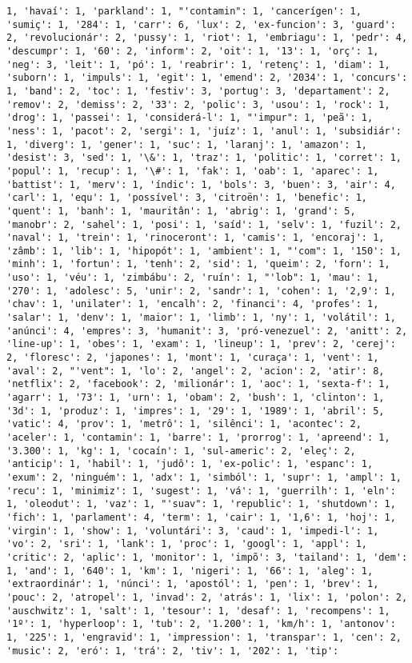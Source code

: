 \documentclass[11pt]{article}
\begin{document}
\begin{Verbatim}[commandchars=\\\{\}]
1, 'havaí': 1, 'parkland': 1, "'contamin": 1, 'cancerígen': 1, 'sumiç': 1, '284': 1, 'carr': 6, 'lux': 2, 'ex-funcion': 3, 'guard': 2, 'revolucionár': 2, 'pussy': 1, 'riot': 1, 'embriagu': 1, 'pedr': 4, 'descumpr': 1, '60': 2, 'inform': 2, 'oit': 1, '13': 1, 'orç': 1, 'neg': 3, 'leit': 1, 'pó': 1, 'reabrir': 1, 'retenç': 1, 'diam': 1, 'suborn': 1, 'impuls': 1, 'egit': 1, 'emend': 2, '2034': 1, 'concurs': 1, 'band': 2, 'toc': 1, 'festiv': 3, 'portug': 3, 'departament': 2, 'remov': 2, 'demiss': 2, '33': 2, 'polic': 3, 'usou': 1, 'rock': 1, 'drog': 1, 'passei': 1, 'considerá-l': 1, "'impur": 1, 'peã': 1, 'ness': 1, 'pacot': 2, 'sergi': 1, 'juíz': 1, 'anul': 1, 'subsidiár': 1, 'diverg': 1, 'gener': 1, 'suc': 1, 'laranj': 1, 'amazon': 1, 'desist': 3, 'sed': 1, '\&': 1, 'traz': 1, 'politic': 1, 'corret': 1, 'popul': 1, 'recup': 1, '\#': 1, 'fak': 1, 'oab': 1, 'aparec': 1, 'battist': 1, 'merv': 1, 'índic': 1, 'bols': 3, 'buen': 3, 'air': 4, 'carl': 1, 'equ': 1, 'possível': 3, 'citroën': 1, 'benefic': 1, 'quent': 1, 'banh': 1, 'mauritân': 1, 'abrig': 1, 'grand': 5, 'manobr': 2, 'sahel': 1, 'posi': 1, 'saíd': 1, 'selv': 1, 'fuzil': 2, 'naval': 1, 'trein': 1, 'rinoceront': 1, 'camis': 1, 'encoraj': 1, 'zâmb': 1, 'lib': 1, 'hipopót': 1, 'ambient': 1, "'com": 1, '150': 1, 'minh': 1, 'fortun': 1, 'tenh': 2, 'sid': 1, 'queim': 2, 'forn': 1, 'uso': 1, 'véu': 1, 'zimbábu': 2, 'ruín': 1, "'lob": 1, 'mau': 1, '270': 1, 'adolesc': 5, 'unir': 2, 'sandr': 1, 'cohen': 1, '2,9': 1, 'chav': 1, 'unilater': 1, 'encalh': 2, 'financi': 4, 'profes': 1, 'salar': 1, 'denv': 1, 'maior': 1, 'limb': 1, 'ny': 1, 'volátil': 1, 'anúnci': 4, 'empres': 3, 'humanit': 3, 'pró-venezuel': 2, 'anitt': 2, 'line-up': 1, 'obes': 1, 'exam': 1, 'lineup': 1, 'prev': 2, 'cerej': 2, 'floresc': 2, 'japones': 1, 'mont': 1, 'curaça': 1, 'vent': 1, 'aval': 2, "'vent": 1, 'lo': 2, 'angel': 2, 'acion': 2, 'atir': 8, 'netflix': 2, 'facebook': 2, 'milionár': 1, 'aoc': 1, 'sexta-f': 1, 'agarr': 1, '73': 1, 'urn': 1, 'obam': 2, 'bush': 1, 'clinton': 1, '3d': 1, 'produz': 1, 'impres': 1, '29': 1, '1989': 1, 'abril': 5, 'vatic': 4, 'prov': 1, 'metrô': 1, 'silênci': 1, 'acontec': 2, 'aceler': 1, 'contamin': 1, 'barre': 1, 'prorrog': 1, 'apreend': 1, '3.300': 1, 'kg': 1, 'cocaín': 1, 'sul-americ': 2, 'eleç': 2, 'anticip': 1, 'habil': 1, 'judô': 1, 'ex-polic': 1, 'espanc': 1, 'exum': 2, 'ninguém': 1, 'adx': 1, 'simból': 1, 'supr': 1, 'ampl': 1, 'recu': 1, 'minimiz': 1, 'sugest': 1, 'vá': 1, 'guerrilh': 1, 'eln': 1, 'oleodut': 1, 'vaz': 1, "'suav": 1, 'republic': 1, 'shutdown': 1, 'fich': 1, 'parlament': 4, 'term': 1, 'cair': 1, '1,6': 1, 'hoj': 1, 'virgin': 1, 'show': 1, 'voluntári': 3, 'caud': 1, 'impedi-l': 1, 'vo': 2, 'sri': 1, 'lank': 1, 'proc': 1, 'googl': 1, 'appl': 1, 'critic': 2, 'aplic': 1, 'monitor': 1, 'impõ': 3, 'tailand': 1, 'dem': 1, 'and': 1, '640': 1, 'km': 1, 'nigeri': 1, '66': 1, 'aleg': 1, 'extraordinár': 1, 'núnci': 1, 'apostól': 1, 'pen': 1, 'brev': 1, 'pouc': 2, 'atropel': 1, 'invad': 2, 'atrás': 1, 'lix': 1, 'polon': 2, 'auschwitz': 1, 'salt': 1, 'tesour': 1, 'desaf': 1, 'recompens': 1, '1º': 1, 'hyperloop': 1, 'tub': 2, '1.200': 1, 'km/h': 1, 'antonov': 1, '225': 1, 'engravid': 1, 'impression': 1, 'transpar': 1, 'cen': 2, 'music': 2, 'eró': 1, 'trá': 2, 'tiv': 1, '202': 1, 'tip': 
\end{Verbatim}
\end{document}
